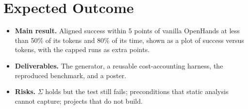 \documentclass[sigconf,nonacm]{acmart}
\newcommand{\suff}{\ensuremath{\Sigma}\xspace}
\begin{document}
\section{Expected Outcome}
\begin{itemize}
  \item \textbf{Main result.} Aligned success within 5 points of vanilla OpenHands at less than 50\% of its tokens and 80\% of its time, shown as a plot of success versus tokens, with the capped runs as extra points.
  \item \textbf{Deliverables.} The generator, a reusable cost-accounting harness, the reproduced benchmark, and a poster.
  \item \textbf{Risks.} \suff holds but the test still fails; preconditions that static analysis cannot capture; projects that do not build.
\end{itemize}



\end{document}
